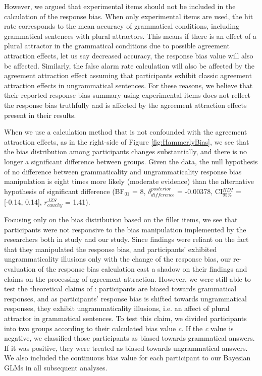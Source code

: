 However, we argued that experimental items should not be included in the calculation of the response bias.
When only experimental items are used, the hit rate corresponds to the mean accuracy of grammatical conditions, including grammatical sentences with plural attractors. 
This means if there is an effect of a plural attractor in the grammatical conditions due to possible agreement attraction effects, let us say decreased accuracy, the response bias value will also be affected.
Similarly, the false alarm rate calculation will also be affected by the agreement attraction effect assuming that participants exhibit classic agreement attraction effects in ungrammatical sentences.
For these reasons, we believe that their reported response bias summary using experimental items does not reflect the response bias truthfully and is affected by the agreement attraction effects present in their results.

When we use a calculation method that is not confounded with the agreement attraction effects, as in the right-side of Figure \ref{fig:HammerlyBias}, we see that the bias distribution among participants changes substantially, and there is no longer a significant difference between groups. 
Given the data, the null hypothesis of no difference between grammaticality and ungrammaticality response bias manipulation is eight times more likely (moderate evidence) than the alternative hypothesis of significant difference (BF$_{01}$ = 8, $\delta_{difference}^{posterior}$ = -0.00378, CI$_{95\%}^{HDI}$ = [-0.14, 0.14], $r_{cauchy}^{JZS}$ = 1.41).

Focusing only on the bias distribution based on the filler items, 
we see that participants were not responsive to the bias manipulation implemented by the researchers 
both in \cites{HammerlyEtAl2019} study and our study. 
Since \cites{HammerlyEtAl2019} findings were reliant on the fact that they manipulated the response bias, and participants' exhibited ungrammaticality illusions only with the change of the response bias, 
our re-evaluation of the response bias calculation cast a shadow on their findings and claims on the processing of agreement attraction. 
However, we were still able to test the theoretical claims of : participants are biased towards grammatical responses, and as participants' response bias is shifted towards ungrammatical responses, they exhibit ungrammaticality illusions, i.e. an affect of plural attractor in grammatical sentences. 
To test this claim, we divided participants into two groups according to their calculated bias value \emph{c}. 
If the \emph{c} value is negative, we classified those participants as biased towards grammatical answers. 
If it was positive, they were treated as biased towards ungrammatical answers. 
We also included the continuous bias value for each participant to our Bayesian GLMs in all subsequent analyses.


